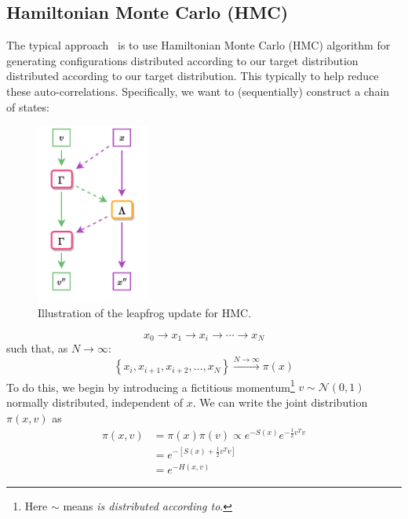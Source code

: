 \documentclass[a4paper,11pt]{article}
\begin{document}
\subsection{\label{subsec:hmc}Hamiltonian Monte Carlo (HMC)}
%
The typical approach~\cite{HMC} is to use Hamiltonian Monte Carlo (HMC)
algorithm for generating configurations distributed according to our
target distribution 
distributed according to our target
distribution.
%
This typically 
to help
reduce these auto-correlations.
%
Specifically, we want to (sequentially) construct a chain of states:
%
\begin{figure}
  \begin{center}
  \includegraphics[width=0.33\textwidth]{assets/hmc-update6.pdf}
  \end{center}
    \caption{\label{fig:hmc-update}Illustration of the leapfrog update for HMC.}
\end{figure}
%
\begin{equation}
x_{0} \rightarrow x_{1} \rightarrow x_{i} \rightarrow \cdots \rightarrow x_{N}
\end{equation}
%
such that, as $N \rightarrow \infty$:
%
\begin{equation}
\left\{x_{i}, x_{i+1}, x_{i+2}, \ldots, x_{N}\right\} \xrightarrow[]{N\rightarrow\infty} \pi(x)
\end{equation}
%
To do this, we begin by introducing a fictitious momentum\footnote{Here $\sim$ means \textit{is distributed according to}.} $v \sim \mathcal{N}(0, 1)$ normally distributed, independent of $x$.
%
We can write the joint distribution $\pi(x, v)$ as
%
\begin{align}
\pi(x, v) &= \pi(x) \pi(v) \propto e^{-S(x)} e^{-\frac{1}{2} v^{T}v} \\
&= e^{-\left[S(x) + \frac{1}{2} v^{T} v \right]} \\
&= e^{-H(x, v)}
\end{align}
\end{document}
